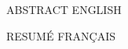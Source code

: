 \pagestyle{empty}


\footnotesize

ABSTRACT ENGLISH

\etoile

\pagestyle{empty}

\footnotesize

\begin{singlespace}
	
RESUMÉ FRANÇAIS

\end{singlespace}